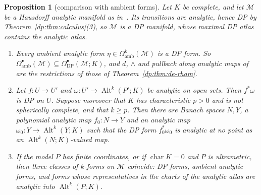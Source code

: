 \documentclass[11pt]{amsart}
\newtheorem{proposition}[theorem]{Proposition}
\theoremstyle{definition}
\theoremstyle{remark}
\numberwithin{equation}{section}
\newcommand{\Alt}{\operatorname{Alt}}
\theoremstyle{plain}
\theoremstyle{definition}
\theoremstyle{plain}
\newcommand{\cM}{\mathcal M}
\begin{document}
\begin{proposition}[comparison with ambient forms]\label{dp:prop:forms-compare}
Let $K$ be complete, and let $\cM$ be a Hausdorff analytic manifold as in~\cite[Section~10.3]{I}. Its transitions are analytic, hence DP by Theorem~\ref{dp:thm:calculus}(3), so $\cM$ is a DP manifold, whose maximal DP atlas contains the analytic atlas.
\begin{enumerate}
\item Every ambient analytic form $\eta\in\Omega^k_{\mathrm{amb}}(\cM)$ is a DP form. So $\Omega^\bullet_{\mathrm{amb}}(\cM)\subseteq\Omega^\bullet_{\mathrm{DP}}(\cM;K)$, and $d$, $\wedge$ and pullback along analytic maps of~\cite[Theorem~10.7]{I} are the restrictions of those of Theorem~\ref{dp:thm:de-rham}.
\item Let $f\colon U\to U'$ and $\omega\colon U'\to\Alt^k(P';K)$ be analytic on open sets. Then $f^*\omega$ is DP on $U$. Suppose moreover that $K$ has characteristic $p>0$ and is not spherically complete, and that $k\ge p$. Then there are Banach spaces $N,Y$, a polynomial analytic map $f_0\colon N\to Y$ and an analytic map $\omega_0\colon Y\to\Alt^k(Y;K)$ such that the DP form $f_0^*\omega_0$ is analytic at no point as an $\Alt^k(N;K)$-valued map.
\item If the model $P$ has finite coordinates, or if $\operatorname{char}K=0$ and $P$ is ultrametric, then three classes of $k$-forms on $\cM$ coincide: DP forms, ambient analytic forms, and forms whose representatives in the charts of the analytic atlas are analytic into $\Alt^k(P;K)$.
\end{enumerate}
\end{proposition}
\end{document}
